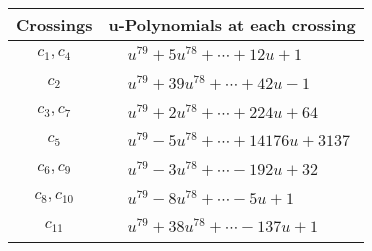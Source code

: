 \documentclass[1p]{elsarticle_modified}
\theoremstyle{definition}
\begin{document}
\begin{tabular}{m{50pt}|m{274pt}}
Crossings & \hspace{64pt}u-Polynomials at each crossing \\
\hline $$\begin{aligned}c_{1},c_{4}\end{aligned}$$&$\begin{aligned}
&u^{79}+5 u^{78}+\cdots+12 u+1
\end{aligned}$\\
\hline $$\begin{aligned}c_{2}\end{aligned}$$&$\begin{aligned}
&u^{79}+39 u^{78}+\cdots+42 u-1
\end{aligned}$\\
\hline $$\begin{aligned}c_{3},c_{7}\end{aligned}$$&$\begin{aligned}
&u^{79}+2 u^{78}+\cdots+224 u+64
\end{aligned}$\\
\hline $$\begin{aligned}c_{5}\end{aligned}$$&$\begin{aligned}
&u^{79}-5 u^{78}+\cdots+14176 u+3137
\end{aligned}$\\
\hline $$\begin{aligned}c_{6},c_{9}\end{aligned}$$&$\begin{aligned}
&u^{79}-3 u^{78}+\cdots-192 u+32
\end{aligned}$\\
\hline $$\begin{aligned}c_{8},c_{10}\end{aligned}$$&$\begin{aligned}
&u^{79}-8 u^{78}+\cdots-5 u+1
\end{aligned}$\\
\hline $$\begin{aligned}c_{11}\end{aligned}$$&$\begin{aligned}
&u^{79}+38 u^{78}+\cdots-137 u+1
\end{aligned}$\\
\hline
\end{tabular}\\~\\
\newpage\renewcommand{\arraystretch}{1}
\end{document}

